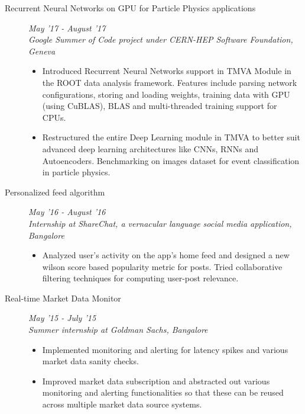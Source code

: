 \documentclass[9pt]{article}
\newenvironment{changemargin}[2]{%
  \begin{list}{}{%
      \setlength{\topsep}{0pt}%
    \setlength{\leftmargin}{#1}%
    \setlength{\rightmargin}{#2}%
    \setlength{\listparindent}{\parindent}%
  \setlength{\itemindent}{\parindent}%
    \setlength{\parsep}{\parskip}%
    }%
  \item[]}{\end{list}
    }
\newenvironment{body} {
  \vspace*{-16pt}
        \begin{changemargin}{-0.6in}{-0.65in}
        }	
        {\end{changemargin}
}
\begin{document}
\begin{body}
\begin{description}
    \item[\normalsize{Recurrent Neural Networks on GPU for Particle Physics applications}] \hfill \textit{May '17 - August '17} \\
      \textit{Google Summer of Code project under CERN-HEP Software Foundation, Geneva}
      \begin{itemize}
        \item Introduced Recurrent Neural Networks support in TMVA Module in the
          ROOT data analysis framework. Features include parsing network 
          configurations, storing and loading weights, training data with GPU 
          (using CuBLAS), BLAS and multi-threaded training support for CPUs.
        \item Restructured the entire Deep Learning module in TMVA to better 
          suit advanced deep learning architectures like CNNs, RNNs and 
          Autoencoders. Benchmarking on images dataset for event classification
          in particle physics.
      \end{itemize}

    \item [\normalsize{Personalized feed algorithm}] \hfill \textit{May '16 - August '16} \\
      \textit{Internship at ShareChat, a vernacular language social media application, Bangalore} \\
      \begin{itemize}
        \item Analyzed user's activity on the app's home feed and designed a new
          wilson score based popularity metric for posts. Tried collaborative 
          filtering techniques for computing user-post relevance.
      \end{itemize}

    \item[\normalsize{Real-time Market Data Monitor}] \hfill \textit{May '15 - July '15} \\
      \textit{Summer internship at Goldman Sachs, Bangalore} 
      \begin{itemize}
        \item Implemented monitoring and alerting for latency spikes and various
          market data sanity checks.
        \item Improved market data subscription and abstracted out various 
          monitoring and alerting functionalities so that these can be reused 
          across multiple market data source systems.
      \end{itemize}

  \end{description}

\end{body}
\end{document}
